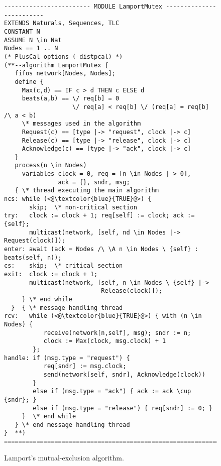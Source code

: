 \documentclass{article}
\begin{document}
\begin{figure}
\begin{lstlisting}[language=pluscal,frame = tlrb, numbers=none]
------------------------ MODULE LamportMutex -------------------------
EXTENDS Naturals, Sequences, TLC
CONSTANT N
ASSUME N \in Nat 
Nodes == 1 .. N
(* PlusCal options (-distpcal) *)
(**--algorithm LamportMutex {
   fifos network[Nodes, Nodes];
   define {
     Max(c,d) == IF c > d THEN c ELSE d
     beats(a,b) == \/ req[b] = 0
                   \/ req[a] < req[b] \/ (req[a] = req[b] /\ a < b)
     \* messages used in the algorithm
     Request(c) == [type |-> "request", clock |-> c]
     Release(c) == [type |-> "release", clock |-> c]
     Acknowledge(c) == [type |-> "ack", clock |-> c]
   }
   process(n \in Nodes)
     variables clock = 0, req = [n \in Nodes |-> 0],
               ack = {}, sndr, msg;
   { \* thread executing the main algorithm
ncs: while (<@\textcolor{blue}{TRUE}@>) {
       skip;  \* non-critical section
try:   clock := clock + 1; req[self] := clock; ack := {self};
       multicast(network, [self, nd \in Nodes |-> Request(clock)]);
enter: await (ack = Nodes /\ \A n \in Nodes \ {self} : beats(self, n));
cs:    skip;  \* critical section
exit:  clock := clock + 1;
       multicast(network, [self, n \in Nodes \ {self} |->
                           Release(clock)]);
     } \* end while
  }  { \* message handling thread
rcv:   while (<@\textcolor{blue}{TRUE}@>) { with (n \in Nodes) {
           receive(network[n,self], msg); sndr := n;
           clock := Max(clock, msg.clock) + 1
        };
handle: if (msg.type = "request") {
           req[sndr] := msg.clock;
           send(network[self, sndr], Acknowledge(clock))
        }
        else if (msg.type = "ack") { ack := ack \cup {sndr}; }
        else if (msg.type = "release") { req[sndr] := 0; }
     }  \* end while
   } \* end message handling thread
}  **)
======================================================================
\end{lstlisting}
  \caption{Lamport's mutual-exclusion algorithm.}
  \label{fig:lamport-mutex}
\end{figure}
\end{document}
